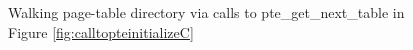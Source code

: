 \begin{figure}
\fi
{}
\caption{Walking page-table directory via calls to \textsf{pte\_get\_next\_table} in Figure \ref{fig:calltopteinitializeC}}
\label{walkpgdirC}
\vspace{-1em}
\end{figure}

